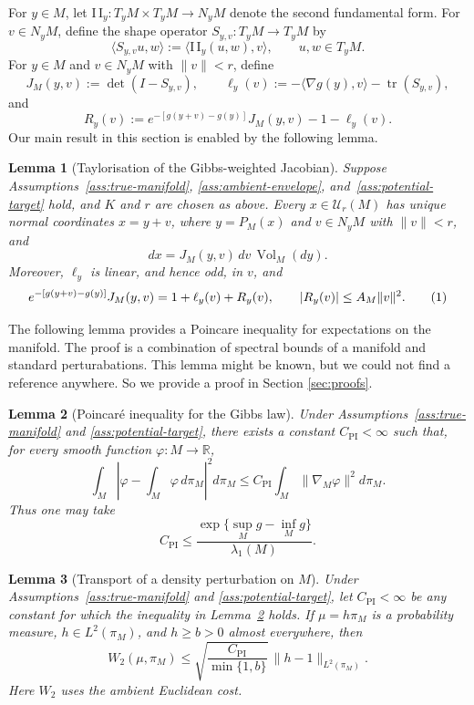 \documentclass{article}
\newtheorem{lemma}{Lemma}
\newcommand{\R}{\mathbb R}
\newcommand{\Vol}{\operatorname{Vol}}
\numberwithin{equation}{section}
\newcommand{\Ucal}{\mathcal{U}}
\newcommand\numberthis{\addtocounter{equation}{1}\tag{\theequation}}
\begin{document}
For $y\in M$, let
$\mathrm{I\,I}_y:T_yM\times T_yM\to N_yM$ denote the second fundamental
form. For $v\in N_yM$, define the shape operator
$S_{y,v}:T_yM\to T_yM$ by
\[
 \langle S_{y,v}u,w\rangle
 :=\langle \mathrm{I\,I}_y(u,w),v\rangle,
 \qquad u,w\in T_yM.
\]
For $y\in M$ and $v\in N_yM$ with $\lVert v\rVert<r$, define
\[
 J_M(y,v):=\det(I-S_{y,v}),
 \qquad
 \ell_y(v):=-\langle\nabla g(y),v\rangle
 -\operatorname{tr}(S_{y,v}),
\]
and
\[
 R_y(v):=e^{-[g(y+v)-g(y)]}J_M(y,v)-1-\ell_y(v).
\]
Our main result in this section is enabled by the following lemma. 
\begin{lemma}[Taylorisation of the Gibbs-weighted Jacobian]
\label{lem:adjusted-potential-expansion}
Suppose Assumptions~\ref{ass:true-manifold},
\ref{ass:ambient-envelope}, and~\ref{ass:potential-target} hold, and $K$ and
$r$ are chosen as above. Every
$x\in\Ucal_r(M)$ has unique normal coordinates $x=y+v$, where $y=P_M(x)$
and $v\in N_yM$ with $\lVert v\rVert<r$, and
\[
 dx=J_M(y,v)\,dv\,\Vol_M(dy).
\]
Moreover, $\ell_y$ is linear, and hence odd, in $v$, and
\[
 e^{-[g(y+v)-g(y)]}J_M(y,v)
 =1+\ell_y(v)+R_y(v),
 \qquad
 |R_y(v)|\le A_M\lVert v\rVert^2.\numberthis\label{eq:taylor-expansion-of-adjustment}
\]
\end{lemma}
The following lemma provides a Poincare inequality for expectations on the manifold. The proof is a combination of spectral bounds of a manifold and standard perturabations. This lemma might be known, but we could not find a reference anywhere. So we provide a proof in Section \ref{sec:proofs}.
\begin{lemma}[Poincar\'e inequality for the Gibbs law]
\label{lem:gibbs-poincare}
Under Assumptions~\ref{ass:true-manifold} and
\ref{ass:potential-target}, there exists a constant
$C_{\mathrm{PI}}<\infty$ such that, for every smooth function
$\varphi:M\to\R$,
\[
 \int_M\left|\varphi-\int_M\varphi\,d\pi_M\right|^2d\pi_M
 \le C_{\mathrm{PI}}\int_M\|\nabla_M\varphi\|^2d\pi_M.
\]
Thus one may take
\[
 C_{\mathrm{PI}}
 \le \frac{\exp\{\sup_M g-\inf_M g\}}{\lambda_1(M)}.
\]
\end{lemma}


\begin{lemma}[Transport of a density perturbation on $M$]
\label{lem:manifold-density-transport}
Under Assumptions~\ref{ass:true-manifold} and
\ref{ass:potential-target}, let $C_{\mathrm{PI}}<\infty$ be any constant
for which the inequality in Lemma~\ref{lem:gibbs-poincare} holds.
If $\mu=h\pi_M$ is a probability measure,
$h\in L^2(\pi_M)$, and $h\ge b>0$ almost everywhere, then
\[
 W_2(\mu,\pi_M)
 \le
 \sqrt{\frac{C_{\mathrm{PI}}}{\min\{1,b\}}}\,
 \|h-1\|_{L^2(\pi_M)}.
\]
Here $W_2$ uses the ambient Euclidean cost.
\end{lemma}
\end{document}
